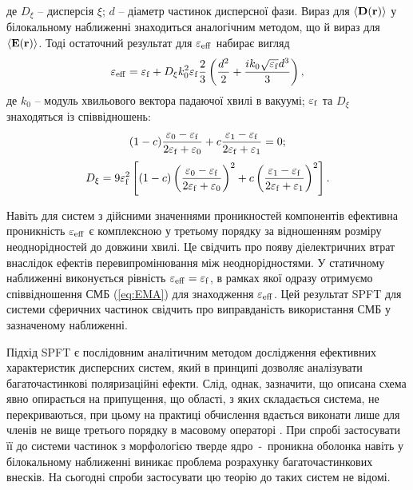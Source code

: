 \documentclass[14pt,twoside]{vakthesis}
\begin{document}
де $D_{\xi}$ -- дисперсія $\xi$; $d$ -- діаметр частинок дисперсної фази.
Вираз для $\langle {\bf D} ({\bf r}) \rangle$ у білокальному наближенні знаходиться аналогічним методом, що й вираз для $\langle {\bf E} ({\bf r}) \rangle$. Тоді остаточний результат для $\varepsilon_{\rm eff}$ \cite{Tsang1981} набирає вигляд
\begin{equation}\label{eq:eps_eff-SPFT}
{\varepsilon}_{\rm eff} = {\varepsilon}_{\rm f} + D_{\xi} k_0^2 {\varepsilon}_{\rm f} \frac{2}{3} \left( \frac{d^2}{2} + \frac{ik_0 \sqrt{{\varepsilon}_{\rm f}} d^3}{3} \right),
\end{equation}
де $k_0$ -- модуль хвильового вектора падаючої хвилі в вакуумі; $\varepsilon_{\rm f}$ та $D_\xi$ знаходяться із  співвідношень:
\begin{eqnarray}\label{eq:Brug-SPFT}
(1-c)\frac{{\varepsilon}_0 - {\varepsilon}_{\rm f}}{2{\varepsilon}_{\rm f} + {\varepsilon}_0}
+c\frac{{\varepsilon}_1 - {\varepsilon}_{\rm f}}{2{\varepsilon}_{\rm f} + {\varepsilon}_1} = 0;
\end{eqnarray}
\begin{eqnarray}\label{eq:Dxi-SPFT}
D_{\xi} = 9 {\varepsilon}_{\rm f}^2 \left[ (1-c) \left(\frac{{\varepsilon}_0 - {\varepsilon}_{\rm f}}{2{\varepsilon}_{\rm f} + {\varepsilon}_0} \right)^2
+c \left(\frac{{\varepsilon}_1 - {\varepsilon}_{\rm f}}{2{\varepsilon}_{\rm f} + {\varepsilon}_1}\right)^2 \right].
\end{eqnarray}

Навіть для систем з дійсними значеннями проникностей компонентів ефективна проникність $\varepsilon_{\rm eff}$ є комплексною у третьому порядку за відношенням розміру неоднорідностей до довжини хвилі. Це свідчить про появу діелектричних втрат внаслідок  ефектів перевипромінювання між неоднорідностями.
У статичному наближенні  виконується рівність ${\varepsilon}_{\rm eff} = {\varepsilon}_{\rm f}$, в рамках якої одразу отримуємо співвідношення СМБ (\ref{eq:EMA}) для знаходження ${\varepsilon}_{\rm eff}$. Цей результат SPFT для системи сферичних частинок  свідчить про виправданість використання  СМБ у зазначеному наближенні.

Підхід SPFT є послідовним аналітичним методом дослідження ефективних характеристик дисперсних систем, який в принципі дозволяє аналізувати багаточастинкові поляризаційні ефекти. %
Слід, однак, зазначити, що описана схема явно опирається на припущення, що області, з яких складається система, не перекриваються, 
при цьому на практиці обчислення вдається виконати лише для членів не вище третього порядку в масовому операторі \cite{Mackay2001}. При спробі застосувати її до системи частинок з морфологією тверде ядро~-~проникна оболонка навіть у білокальному наближенні виникає проблема розрахунку  багаточастинкових внесків. На сьогодні спроби застосувати цю теорію до таких систем не відомі.
\end{document}
